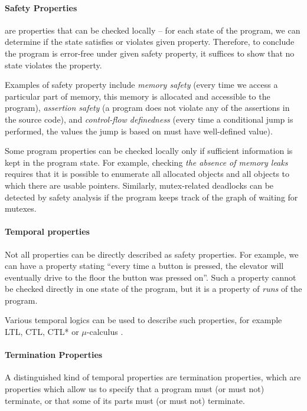 \paragraph{Safety Properties}
%
are properties that can be checked locally -- for each state of the program, we
can determine if the state satisfies or violates given property.
Therefore, to conclude the program is error-free under given safety property, it suffices to show that no state violates the property.

Examples of safety property include \emph{memory safety} (every
time we access a particular part of memory, this memory is allocated and
accessible to the program), \emph{assertion safety} (a program
does not violate any of the assertions in the source code), and
\emph{control-flow definedness} (every time a conditional jump is
performed, the values the jump is based on must have well-defined value).

Some program properties can be checked locally only if sufficient information
is kept in the program state.
For example, checking \emph{the absence of memory leaks} requires that it is
possible to enumerate all allocated objects and all objects to which there are
usable pointers.
Similarly, mutex-related deadlocks can be detected by safety analysis if the program keeps track of the graph of waiting for mutexes.

\paragraph{Temporal properties}
%
Not all properties can be directly described as safety properties.
For example, we can have a property stating ``every time a button is pressed, the elevator will eventually drive to the floor the button was pressed on''.
Such a property cannot be checked directly in one state of the program, but it is a property of \emph{runs} of the program.

Various temporal logics can be used to describe such properties, for example
LTL, CTL, CTL*  or $\mu$-calculus .

\paragraph{Termination Properties}
%
A distinguished kind of temporal properties are termination properties, which are properties which allow us to specify that a program must (or must not) terminate, or that some of its parts must (or must not) terminate.


